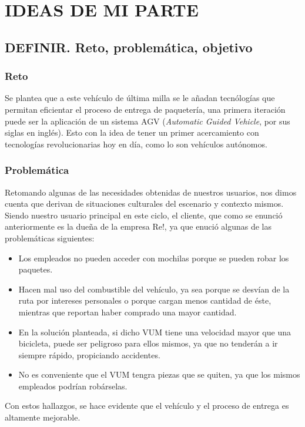 \chapter{IDEAS DE MI PARTE}
\section{DEFINIR. Reto, problemática, objetivo}
\subsection{Reto}

Se plantea que a este vehículo de última milla se le añadan tecnólogías que permitan eficientar el proceso de entrega de paquetería, una primera iteración puede ser la aplicación de un sistema AGV (\textit{Automatic Guided Vehicle}, por sus siglas en inglés). Esto con la idea de tener un primer acercamiento con tecnologías revolucionarias hoy en día, como lo son vehículos autónomos.

\subsection{Problemática}

Retomando algunas de las necesidades obtenidas de nuestros usuarios, nos dimos cuenta que derivan de situaciones culturales del escenario y contexto mismos. Siendo nuestro usuario principal en este ciclo, el cliente, que como se enunció anteriormente es la dueña de la empresa Re!, ya que enució algunas de las problemáticas siguientes:

\begin{itemize}
\item Los empleados no pueden acceder con mochilas porque se pueden robar los paquetes.

\item Hacen mal uso del combustible del vehículo, ya sea porque se desvían de la ruta por intereses personales o porque cargan menos cantidad de éste, mientras que reportan haber comprado una mayor cantidad.

\item En la solución planteada, si dicho VUM tiene una velocidad mayor que una bicicleta, puede ser peligroso para ellos mismos, ya que no tenderán a ir siempre rápido, propiciando accidentes.

\item No es conveniente que el VUM tengra piezas que se quiten, ya que los mismos empleados podrían robárselas.
\end{itemize}
Con estos hallazgos, se hace evidente que el vehículo y el proceso de entrega es altamente mejorable.

